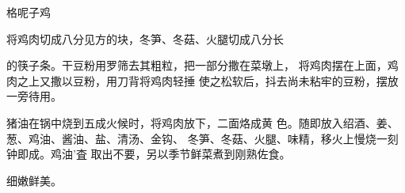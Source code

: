 \begin{recipe}{格呢子鸡}

\ingredients


\cooking

将鸡肉切成八分见方的块，冬笋、冬菇、火腿切成八分长

的筷子条。干豆粉用罗筛去其粗粒，把一部分撒在菜墩上， 将鸡肉摆在上面，鸡肉之上又撒以豆粉，用刀背将鸡肉轻捶 使之松软后，抖去尚未粘牢的豆粉，摆放一旁待用。

猪油在锅中烧到五成火候时，将鸡肉放下，二面烙成黄 色。随即放入绍酒、姜、葱、鸡油、酱油、盐、清汤、金钩、 冬笋、冬菇、火腿、味精，移火上慢烧一刻钟即成。鸡油'査 取出不要，另以季节鲜菜煮到刚熟佐食。

\notes

细嫩鲜美。

\end{recipe}

